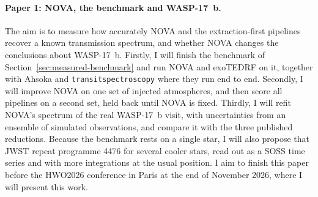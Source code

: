\paragraph{Paper 1: NOVA, the benchmark and WASP-17~b.} The aim is to measure
how accurately NOVA and the extraction-first pipelines recover a known
transmission spectrum, and whether NOVA changes the conclusions about
WASP-17~b. Firstly, I will finish the benchmark of
Section~\ref{sec:measured-benchmark} and run NOVA and exoTEDRF on it, together
with Ahsoka and \texttt{transitspectroscopy} where they run end to end.
Secondly, I will improve NOVA on one set of injected atmospheres, and then
score all pipelines on a second set, held back until NOVA is fixed. Thirdly, I
will refit NOVA's spectrum of the real WASP-17~b visit, with uncertainties
from an ensemble of simulated observations, and compare it with the three
published reductions. Because the benchmark rests on a single star, I will
also propose that JWST repeat programme 4476 for several cooler stars, read
out as a SOSS time series and with more integrations at the usual position. I
aim to finish this paper before the HWO2026 conference in Paris at the end of
November 2026, where I will present this work.

